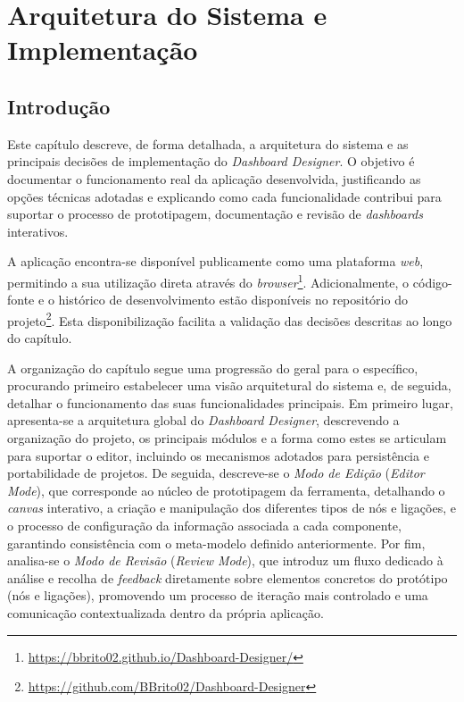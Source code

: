 
%

\chapter{Arquitetura do Sistema e Implementação}
\label{cha:arquitetura_implementacao}

\section{Introdução}
\label{sec:cap4_introducao}

Este capítulo descreve, de forma detalhada, a arquitetura do sistema e as principais decisões de implementação do \textit{Dashboard Designer}. O objetivo é documentar o funcionamento real da aplicação desenvolvida, justificando as opções técnicas adotadas e explicando como cada funcionalidade contribui para suportar o processo de prototipagem, documentação e revisão de \textit{dashboards} interativos.

A aplicação encontra-se disponível publicamente como uma plataforma \textit{web}, permitindo a sua utilização direta através do \textit{browser}\footnote{\url{https://bbrito02.github.io/Dashboard-Designer/}}. Adicionalmente, o código-fonte e o histórico de desenvolvimento estão disponíveis no repositório do projeto\footnote{\url{https://github.com/BBrito02/Dashboard-Designer}}. Esta disponibilização facilita a validação das decisões descritas ao longo do capítulo.

A organização do capítulo segue uma progressão do geral para o específico, procurando primeiro estabelecer uma visão arquitetural do sistema e, de seguida, detalhar o funcionamento das suas funcionalidades principais. Em primeiro lugar, apresenta-se a arquitetura global do \textit{Dashboard Designer}, descrevendo a organização do projeto, os principais módulos e a forma como estes se articulam para suportar o editor, incluindo os mecanismos adotados para persistência e portabilidade de projetos. De seguida, descreve-se o \textit{Modo de Edição} (\textit{Editor Mode}), que corresponde ao núcleo de prototipagem da ferramenta, detalhando o \textit{canvas} interativo, a criação e manipulação dos diferentes tipos de nós e ligações, e o processo de configuração da informação associada a cada componente, garantindo consistência com o meta-modelo definido anteriormente. Por fim, analisa-se o \textit{Modo de Revisão} (\textit{Review Mode}), que introduz um fluxo dedicado à análise e recolha de \textit{feedback} diretamente sobre elementos concretos do protótipo (nós e ligações), promovendo um processo de iteração mais controlado e uma comunicação contextualizada dentro da própria aplicação.

